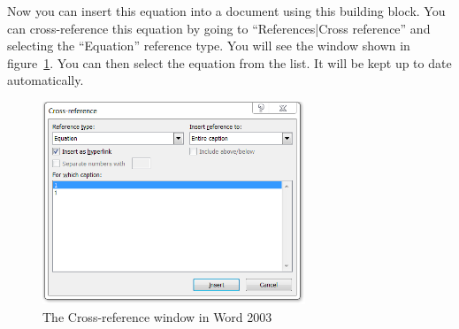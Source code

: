 \documentclass[a5paper, 10pt]{article}
\begin{document}
Now you can insert this equation into a document using this building block.
You can cross-reference this equation by going to ``References|Cross reference'' and selecting the ``Equation'' reference type. 
You will see the window shown in figure~\ref{fig:wordcrossref}. 
You can then select the equation from the list. 
It will be kept up to date automatically.
\begin{figure}[htbp]
  \centering
  \includegraphics[width=0.7\textwidth]{crossreference}
  \caption{The Cross-reference window in Word 2003}
  \label{fig:wordcrossref}
\end{figure}
\end{document}
